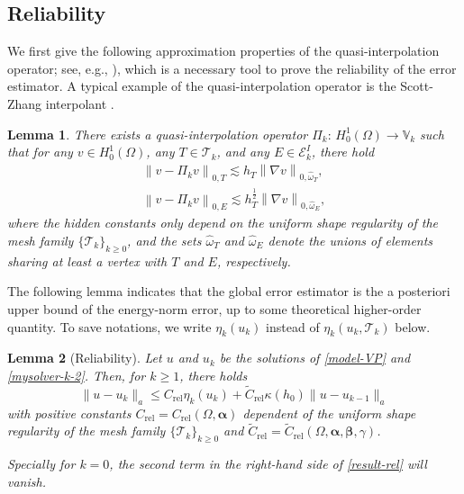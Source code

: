 \documentclass[preprint,times]{elsarticle}%
\newtheorem{lemma}{Lemma}[section]
\numberwithin{algorithm}{section}
\numberwithin{equation}{section}
\newcommand{\rel}{\mathrm{rel}}
\newcommand{\anorm}[1]{\|#1\|_a}
\newcommand{\valpha}{\boldsymbol{\alpha}}
\newcommand{\vbeta}{\boldsymbol{\beta}}
\newcommand{\wtC}{\widetilde{C}}
\newcommand{\mcT}{\mathcal{T}}
\newcommand{\mbV}{\mathbb{V}}
\def\leq{\leqslant}
\def\geq{\geqslant}
\begin{document}
\subsection{Reliability}
 We first give the following approximation properties of the quasi-interpolation operator; see, e.g.,  \cite[Lemma 1.3]{verfurth13Book}), which is a necessary tool to prove the reliability of the error estimator. A typical example of the quasi-interpolation operator is the Scott-Zhang interpolant \cite{ScottZhang90:483}. 
\begin{lemma}\label{Lem:4.1} 
	There exists a quasi-interpolation operator $\Pi_{k}:\,H_0^1(\Omega )\rightarrow \mbV_k$ such that for any $v \in H_0^1(\Omega)$,  any $T\in \mcT_k$, and any $ E \in \mathcal{E}_{k}^I$, there hold 
	\begin{eqnarray}
		\left\|v-\Pi_{k}v\right\|_{0, T} \lesssim h_{T}\left\|\nabla v\right\|_{0, \hat{\omega}_{T}}, \label{operator-approximate-T}\\ 
		\left\|v-\Pi_{k}v\right\|_{0, E} \lesssim h_{T}^{\frac{1}{2}}\left\|\nabla v\right\|_{0, \hat{\omega}_{E}},\label{operator-approximate-E}
	\end{eqnarray} 
where the hidden constants only depend on the uniform shape regularity of the mesh family $\{\mcT_k\}_{k \geq 0}$, and the sets $\hat{\omega}_{T}$ and $\hat{\omega}_{E}$ denote the unions of elements sharing at least a vertex with $T$ and $E$, respectively. 
\end{lemma} 

The following lemma indicates that the global error estimator is the a posteriori upper bound of the energy-norm error, up to some theoretical higher-order quantity. 
	To save notations, we write $\eta_k(u_k)$ instead of $\eta_k(u_k,\mcT_k)$ below. 

\begin{lemma}[Reliability]\label{lem-rel} 
	Let $u$ and $u_k$ be the solutions of \eqref{model-VP} and \eqref{mysolver-k-2}. Then, for $k \geq 1$, there holds 
	\begin{equation}\label{result-rel}
		\anorm{u-u_k} \leq C_\rel \eta_k(u_k) + \widetilde{C}_\rel\kappa(h_0) \anorm{u-u_{k-1}}
	\end{equation}
with positive constants $C_\rel = C_\rel(\Omega,\valpha)$ dependent of the uniform shape regularity of the mesh family $\{\mcT_k\}_{k \geq 0}$ and $\widetilde{C}_\rel = \wtC_\rel(\Omega,\valpha,\vbeta,\gamma)$. 

Specially for $k = 0$, the second term in the right-hand side of \eqref{result-rel} will vanish. 
\end{lemma}
\end{document}
